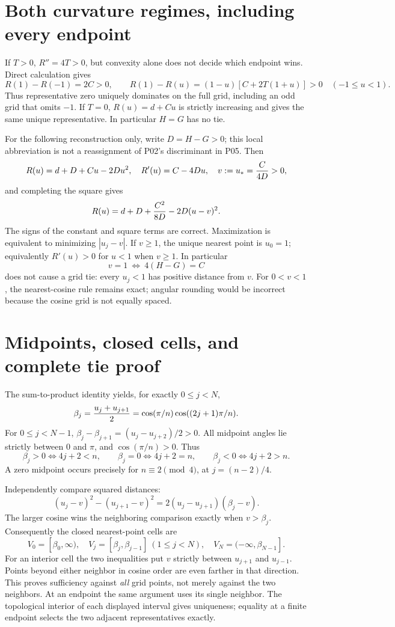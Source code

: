 \documentclass[11pt]{article}
\begin{document}
\section{Both curvature regimes, including every endpoint}
If $T>0$, $R''=4T>0$, but convexity alone does not decide which endpoint
wins. Direct calculation gives
\[
 R(1)-R(-1)=2C>0,\qquad
 R(1)-R(u)=(1-u)[C+2T(1+u)]>0\quad(-1\le u<1).
\]
Thus representative zero uniquely dominates on the full grid, including
an odd grid that omits $-1$. If $T=0$, $R(u)=d+Cu$ is strictly increasing
and gives the same unique representative. In particular $H=G$ has no tie.

For the following reconstruction only, write $D=H-G>0$; this local
abbreviation is not a reassignment of P02's discriminant in P05. Then
\[
 R(u)=d+D+Cu-2Du^2,
 \quad R'(u)=C-4Du,
 \quad v:=u_*={C\over4D}>0,
\]
and completing the square gives
\begin{equation}
 R(u)=d+D+{C^2\over8D}-2D(u-v)^2. \label{a05:square}
\end{equation}
The signs of the constant and square terms are correct. Maximization is
equivalent to minimizing $|u_j-v|$. If $v\ge1$, the unique nearest point
is $u_0=1$; equivalently $R'(u)>0$ for $u<1$ when $v\ge1$.
In particular
\[
 v=1\ \Longleftrightarrow\ 4(H-G)=C
\]
does not cause a grid tie: every $u_j<1$ has positive distance from $v$.
For $0<v<1$, the nearest-cosine rule remains exact; angular rounding would
be incorrect because the cosine grid is not equally spaced.

\section{Midpoints, closed cells, and complete tie proof}
The sum-to-product identity yields, for exactly $0\le j<N$,
\begin{equation}
 \beta_j={u_j+u_{j+1}\over2}
 =\cos(\pi/n)\cos((2j+1)\pi/n). \label{a05:beta}
\end{equation}
For $0\le j<N-1$,
$\beta_j-\beta_{j+1}=(u_j-u_{j+2})/2>0$. All midpoint angles lie
strictly between $0$ and $\pi$, and $\cos(\pi/n)>0$. Thus
\[
 \beta_j>0\iff 4j+2<n,\qquad
 \beta_j=0\iff4j+2=n,\qquad
 \beta_j<0\iff4j+2>n.
\]
A zero midpoint occurs precisely for $n\equiv2\pmod4$, at $j=(n-2)/4$.

Independently compare squared distances:
\[
 (u_j-v)^2-(u_{j+1}-v)^2
 =2(u_j-u_{j+1})(\beta_j-v).
\]
The larger cosine wins the neighboring comparison exactly when
$v>\beta_j$. Consequently the closed nearest-point cells are
\[
 V_0=[\beta_0,\infty),\quad
 V_j=[\beta_j,\beta_{j-1}]\ (1\le j<N),\quad
 V_N=(-\infty,\beta_{N-1}].
\]
For an interior cell the two inequalities put $v$ strictly between
$u_{j+1}$ and $u_{j-1}$. Points beyond either neighbor in cosine order
are even farther in that direction. This proves sufficiency against
\emph{all} grid points, not merely against the two neighbors. At an endpoint
the same argument uses its single neighbor. The topological interior
of each displayed interval gives uniqueness; equality at a finite
endpoint selects the two adjacent representatives exactly.
\end{document}
